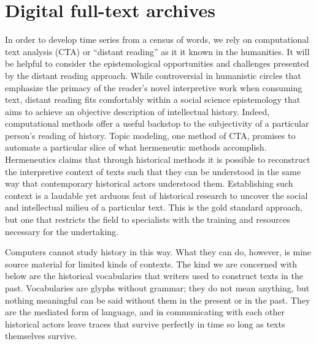 \documentclass[]{book}
\theoremstyle{definition}
\theoremstyle{definition}
\theoremstyle{definition}
\theoremstyle{remark}
\begin{document}
\hypertarget{digital-full-text-archives}{%
\section{Digital full-text archives}\label{digital-full-text-archives}}

In order to develop time series from a census of words, we rely on
computational text analysis (CTA) or ``distant reading'' as it it known
in the humanities. It will be helpful to consider the epistemological
opportunities and challenges presented by the distant reading approach.
While controversial in humanistic circles that emphasize the primacy of
the reader's novel interpretive work when consuming text, distant
reading fits comfortably within a social science epistemology that aims
to achieve an objective description of intellectual history. Indeed,
computational methods offer a useful backstop to the subjectivity of a
particular person's reading of history. Topic modeling, one method of
CTA, promises to automate a particular slice of what hermeneutic methods
accomplish. Hermeneutics claims that through historical methods it is
possible to reconstruct the interpretive context of texts such that they
can be understood in the same way that contemporary historical actors
understood them. Establishing such context is a laudable yet arduous
feat of historical research to uncover the social and intellectual
milieu of a particular text. This is the gold standard approach, but one
that restricts the field to specialists with the training and resources
necessary for the undertaking.

Computers cannot study history in this way. What they can do, however,
is mine source material for limited kinds of contexts. The kind we are
concerned with below are the historical vocabularies that writers used
to construct texts in the past. Vocabularies are glyphs without grammar;
they do not mean anything, but nothing meaningful can be said without
them in the present or in the past. They are the mediated form of
language, and in communicating with each other historical actors leave
traces that survive perfectly in time so long as texts themselves
survive.
\end{document}
